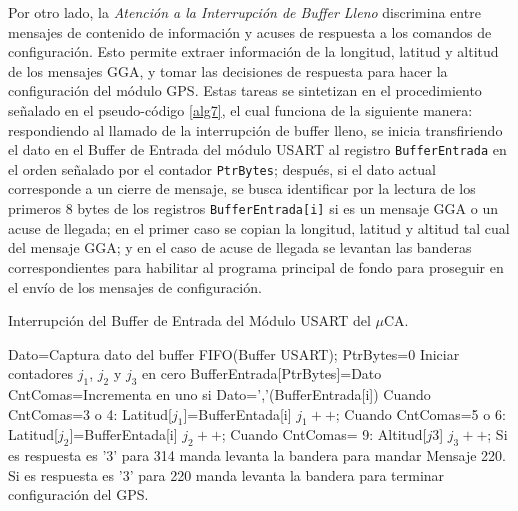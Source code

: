\documentclass[10pt]{report}
\numberwithin{equation}{chapter}
\numberwithin{algorithm}{chapter}
\begin{document}
Por otro lado, la \emph{Atención a la Interrupción de Buffer Lleno} discrimina entre mensajes de contenido de información y acuses de respuesta a los comandos de configuración. Esto permite extraer información de la longitud, latitud y altitud de los mensajes GGA, y tomar las decisiones de respuesta para hacer la configuración del módulo GPS. Estas tareas se sintetizan en el procedimiento señalado en el pseudo-código \ref{alg7}, el cual funciona de la siguiente manera: respondiendo al llamado de la interrupción de buffer lleno, se inicia transfiriendo el dato en el Buffer de Entrada del módulo USART al registro \texttt{BufferEntrada} en el orden señalado por el contador \texttt{PtrBytes}; después, si el dato actual corresponde a un cierre de mensaje, se busca identificar por la lectura de los primeros 8 bytes de los registros \texttt{BufferEntrada[i]} si es un mensaje GGA o un acuse de llegada; en el primer caso se copian la longitud, latitud y altitud tal cual del mensaje GGA; y en el caso de acuse de llegada se levantan las banderas correspondientes para habilitar al programa principal de fondo para proseguir en el envío de los mensajes de configuración. 
\begin{algorithm}[ht]
\caption{Interrupción del Buffer de Entrada del Módulo USART del $\mu$CA.}
\label{alg7}
\begin{algorithmic}\footnotesize
\State Dato=Captura dato del buffer FIFO(Buffer USART);
\State PtrBytes=0\Comment{\textcolor[gray]{0.6}{Inicializa puntero de Bytes.}}
\State Iniciar contadores $j_1$, $j_2$ y $j_3$ en cero
\EndIf
\State BufferEntrada[PtrBytes]=Dato
\Comment{\textcolor[gray]{0.6}{Se identifica si el Mensaje es GGA.}}
\State CntComas=Incrementa en uno si Dato=','(BufferEntrada[i])
\State Cuando CntComas=3 o 4: Latitud[$j_1$]=BufferEntada[i] $j_1++$;
\State Cuando CntComas=5 o 6: Latitud[$j_2$]=BufferEntada[i] $j_2++$;
\State Cuando CntComas= 9: Altitud[$j3$] $j_3++$;
\EndFor
\EndIf
{}\Comment{\textcolor[gray]{0.6}{Busca Mensaje de Acuse de llegada.}}
\State Si es respuesta es '3' para 314 manda levanta la bandera para mandar Mensaje 220.
\State Si es respuesta es '3' para 220 manda levanta la bandera para terminar configuración del GPS.
\EndIf
\EndIf
\end{algorithmic}
\end{algorithm}
\end{document}
